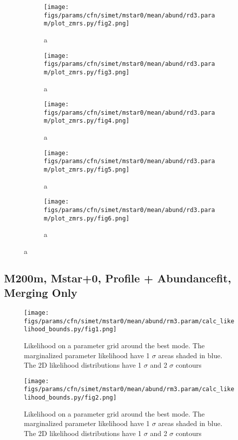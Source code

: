 \documentclass[twocolumn]{article}
\begin{document}
\begin{figure}
  \begin{subfigure}{.5\textwidth}
    \centering\texttt{[image: figs/params/cfn/simet/mstar0/mean/abund/rd3.param/plot\_zmrs.py/fig2.png]}
    \caption{a}
  \end{subfigure}
  \begin{subfigure}{.5\textwidth}
    \centering\texttt{[image: figs/params/cfn/simet/mstar0/mean/abund/rd3.param/plot\_zmrs.py/fig3.png]}
    \caption{a}
  \end{subfigure}
  \begin{subfigure}{.5\textwidth}
    \centering\texttt{[image: figs/params/cfn/simet/mstar0/mean/abund/rd3.param/plot\_zmrs.py/fig4.png]}
    \caption{a}
  \end{subfigure}%
  \begin{subfigure}{.5\textwidth}
    \centering\texttt{[image: figs/params/cfn/simet/mstar0/mean/abund/rd3.param/plot\_zmrs.py/fig5.png]}
    \caption{a}
  \end{subfigure}
  \begin{subfigure}{.5\textwidth}
    \centering\texttt{[image: figs/params/cfn/simet/mstar0/mean/abund/rd3.param/plot\_zmrs.py/fig6.png]}
    \caption{a}
  \end{subfigure}
\end{figure}
\clearpage


\subsection{M200m, Mstar+0, Profile + Abundancefit, Merging Only}
\begin{figure}[H]
  \center\texttt{[image: figs/params/cfn/simet/mstar0/mean/abund/rm3.param/calc\_likelihood\_bounds.py/fig1.png]}
  \caption{Likelihood on a parameter grid around the best mode. The marginalized parameter likelihood have
    1 $\sigma$ areas shaded in blue. The 2D likelihood distributions have 1 $\sigma$  and 2 $\sigma$ contours}
  \label{fig:basic_rd:likelihood}
\end{figure}

\begin{figure}[H]
  \center\texttt{[image: figs/params/cfn/simet/mstar0/mean/abund/rm3.param/calc\_likelihood\_bounds.py/fig2.png]}
  \caption{Likelihood on a parameter grid around the best mode. The marginalized parameter likelihood have
    1 $\sigma$ areas shaded in blue. The 2D likelihood distributions have 1 $\sigma$  and 2 $\sigma$ contours}
  \label{fig:basic_rd:likelihood}

\end{figure}
\end{document}
